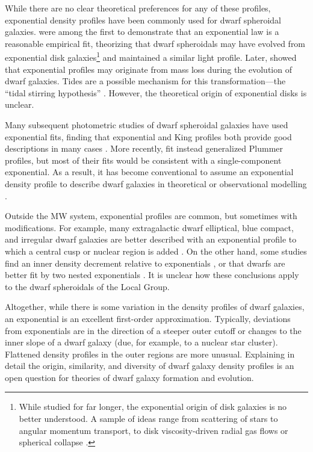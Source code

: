 While there are no clear theoretical preferences for any of these
profiles, exponential density profiles have been commonly used for dwarf
spheroidal galaxies. \citet{faber+lin1983} were among the first to
demonstrate that an exponential law is a reasonable empirical fit,
theorizing that dwarf spheroidals may have evolved from exponential disk
galaxies\footnote{While studied for far longer, the exponential origin
  of disk galaxies is no better understood. A sample of ideas range from
  scattering of stars \citep{elmegreen+struck2013, wu+2022} to angular
  momentum transport, to disk viscosity-driven radial gas flows
  \citep{lin+pringle1987, wang+lilly2022} or spherical collapse
  \citep{freeman1970}.} and maintained a similar light profile. Later,
\citet{read+gilmore2005} showed that exponential profiles may originate
from mass loss during the evolution of dwarf galaxies. Tides are a
possible mechanism for this transformation---the ``tidal stirring
hypothesis'' \citep{mayer+2001a, klimentowski+2009}. However, the
theoretical origin of exponential disks is unclear.

Many subsequent photometric studies of dwarf spheroidal galaxies have
used exponential fits, finding that exponential and King profiles both
provide good descriptions in many cases
\citep{binggeli+sandage+tarenghi1984, mateo1998, mcconnachie+irwin2006, cicuendez+2018}.
More recently, \citet{moskowitz+walker2020} fit instead generalized
Plummer profiles, but most of their fits would be consistent with a
single-component exponential. As a result, it has become conventional to
assume an exponential density profile to describe dwarf galaxies in
theoretical or observational modelling
\citep[e.g.,][]{kowalczyk+2013, martin+2016, MV2020a, battaglia+2022}.

Outside the MW system, exponential profiles are common, but sometimes
with modifications. For example, many extragalactic dwarf elliptical,
blue compact, and irregular dwarf galaxies are better described with an
exponential profile to which a central cusp or nuclear region is added
\citep{caldwell+bothun1987, noeske+2003}. On the other hand, some
studies find an inner density decrement relative to exponentials
\citep[e.g.,][]{caldwell+1992, makarov+2012}, or that dwarfs are better
fit by two nested exponentials
\citep[e.g.,][]{aparicio+1997, graham+guzman2003, hunter+elmegreen2006, lee+2018}.
It is unclear how these conclusions apply to the dwarf spheroidals of
the Local Group.

Altogether, while there is some variation in the density profiles of
dwarf galaxies, an exponential is an excellent first-order
approximation. Typically, deviations from exponentials are in the
direction of a steeper outer cutoff or changes to the inner slope of a
dwarf galaxy (due, for example, to a nuclear star cluster). Flattened
density profiles in the outer regions are more unusual. Explaining in
detail the origin, similarity, and diversity of dwarf galaxy density
profiles is an open question for theories of dwarf galaxy formation and
evolution.

